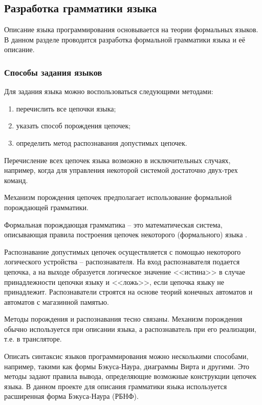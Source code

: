 \subsection{Разработка грамматики языка}

Описание языка программирования основывается на теории формальных языков.
В данном разделе проводится разработка формальной грамматики языка и её описание.


\subsubsection{Способы задания языков}

Для задания языка можно воспользоваться следующими методами:

\begin{enumerate}
    \item перечислить все цепочки языка;
    \item указать способ порождения цепочек;
    \item определить метод распознавания допустимых цепочек.
\end{enumerate}

Перечисление всех цепочек языка возможно в исключительных случаях, например,
когда для управления некоторой системой достаточно двух-трех команд.

Механизм порождения цепочек предполагает использование формальной порождающей грамматики.

Формальная порождающая грамматика -- это математическая система, описывающая правила построения цепочек некоторого (формального) языка .

Распознавание допустимых цепочек осуществляется с помощью некоторого логического устройства -- распознавателя.
На вход распознавателя подается цепочка, а на выходе образуется логическое значение <<истина>> в случае принадлежности цепочки языку
и <<ложь>>, если цепочка языку не принадлежит.
Распознаватели строятся на основе теорий конечных автоматов и автоматов с магазинной памятью.

Методы порождения и распознавания тесно связаны.
Механизм порождения обычно используется при описании языка, а распознаватель при его реализации, т.е. в трансляторе.

Описать синтаксис языков программирования можно несколькими способами, например, такими как формы Бэкуса-Наура, диаграммы Вирта и другими.
Это методы задают правила вывода, определяющие возможные конструкции цепочек языка.
В данном проекте для описания грамматики языка используется расширенная форма Бэкуса-Наура (РБНФ).



